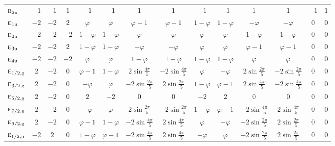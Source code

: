 \documentclass[10pt,a4paper]{article}
\makeatletter
\def\grouprule#1#2{\noalign{\marks\LTgroupmarks{\the\belowrulesep}\nobreak\vskip#1%
  \vskip\aboverulesep}\multispan\LT@cols\unskip{\leaders\hrule\@height#2\hfill\kern\z@}\cr
  \noalign{\penalty\LTrulebreak\vskip\belowrulesep\global\@lastruleclass\z@}}
\numberwithin{equation}{section}
\newcommand{\irr}[1]{\text{\normalfont\scshape #1}}
\newcommand{\ptag}[1]{\mathrm{#1}}
\newcommand{\goldenratio}{\varphi}
\makeatother
\begin{document}
{{\begin{longtable}{@{}lccccccccccccc@{}}
$\irr{b}_{2\ptag{u}}$ & $-1$ & $-1$ & $1$ & $-1$ & $-1$ & $1$ & $1$ & $-1$ & $-1$ & $1$ & $1$ & $-1$ & $1$\\
$\irr{e}_{1\ptag{u}}$ & $-2$ & $-2$ & $2$ & $\goldenratio{}$ & $\goldenratio{}$ & $\goldenratio - 1$ & $\goldenratio - 1$ & $1 - \goldenratio{}$ & $1 - \goldenratio{}$ & $-\goldenratio{}$ & $-\goldenratio{}$ & $0$ & $0$\\
$\irr{e}_{2\ptag{u}}$ & $-2$ & $-2$ & $-2$ & $1 - \goldenratio{}$ & $1 - \goldenratio{}$ & $\goldenratio{}$ & $\goldenratio{}$ & $\goldenratio{}$ & $\goldenratio{}$ & $1 - \goldenratio{}$ & $1 - \goldenratio{}$ & $0$ & $0$\\
$\irr{e}_{3\ptag{u}}$ & $-2$ & $-2$ & $2$ & $1 - \goldenratio{}$ & $1 - \goldenratio{}$ & $-\goldenratio{}$ & $-\goldenratio{}$ & $\goldenratio{}$ & $\goldenratio{}$ & $\goldenratio - 1$ & $\goldenratio - 1$ & $0$ & $0$\\
$\irr{e}_{4\ptag{u}}$ & $-2$ & $-2$ & $-2$ & $\goldenratio{}$ & $\goldenratio{}$ & $1 - \goldenratio{}$ & $1 - \goldenratio{}$ & $1 - \goldenratio{}$ & $1 - \goldenratio{}$ & $\goldenratio{}$ & $\goldenratio{}$ & $0$ & $0$\\
\grouprule{0pt}{\lightrulewidth}
$\irr{e}_{1/2,\ptag{g}}$ & $2$ & $-2$ & $0$ & $\goldenratio - 1$ & $1 - \goldenratio{}$ & $2\sin\tfrac{4\pi}{5}$ & $-2\sin\tfrac{4\pi}{5}$ & $\goldenratio{}$ & $-\goldenratio{}$ & $2\sin\tfrac{2\pi}{5}$ & $-2\sin\tfrac{2\pi}{5}$ & $0$ & $0$\\
$\irr{e}_{3/2,\ptag{g}}$ & $2$ & $-2$ & $0$ & $-\goldenratio{}$ & $\goldenratio{}$ & $-2\sin\tfrac{2\pi}{5}$ & $2\sin\tfrac{2\pi}{5}$ & $1 - \goldenratio{}$ & $\goldenratio - 1$ & $2\sin\tfrac{4\pi}{5}$ & $-2\sin\tfrac{4\pi}{5}$ & $0$ & $0$\\
$\irr{e}_{5/2,\ptag{g}}$ & $2$ & $-2$ & $0$ & $2$ & $-2$ & $0$ & $0$ & $-2$ & $2$ & $0$ & $0$ & $0$ & $0$\\
$\irr{e}_{7/2,\ptag{g}}$ & $2$ & $-2$ & $0$ & $-\goldenratio{}$ & $\goldenratio{}$ & $2\sin\tfrac{2\pi}{5}$ & $-2\sin\tfrac{2\pi}{5}$ & $1 - \goldenratio{}$ & $\goldenratio - 1$ & $-2\sin\tfrac{4\pi}{5}$ & $2\sin\tfrac{4\pi}{5}$ & $0$ & $0$\\
$\irr{e}_{9/2,\ptag{g}}$ & $2$ & $-2$ & $0$ & $\goldenratio - 1$ & $1 - \goldenratio{}$ & $-2\sin\tfrac{4\pi}{5}$ & $2\sin\tfrac{4\pi}{5}$ & $\goldenratio{}$ & $-\goldenratio{}$ & $-2\sin\tfrac{2\pi}{5}$ & $2\sin\tfrac{2\pi}{5}$ & $0$ & $0$\\
$\irr{e}_{1/2,\ptag{u}}$ & $-2$ & $2$ & $0$ & $1 - \goldenratio{}$ & $\goldenratio - 1$ & $-2\sin\tfrac{4\pi}{5}$ & $2\sin\tfrac{4\pi}{5}$ & $-\goldenratio{}$ & $\goldenratio{}$ & $-2\sin\tfrac{2\pi}{5}$ & $2\sin\tfrac{2\pi}{5}$ & $0$ & $0$\\

\end{longtable}}}
\end{document}
